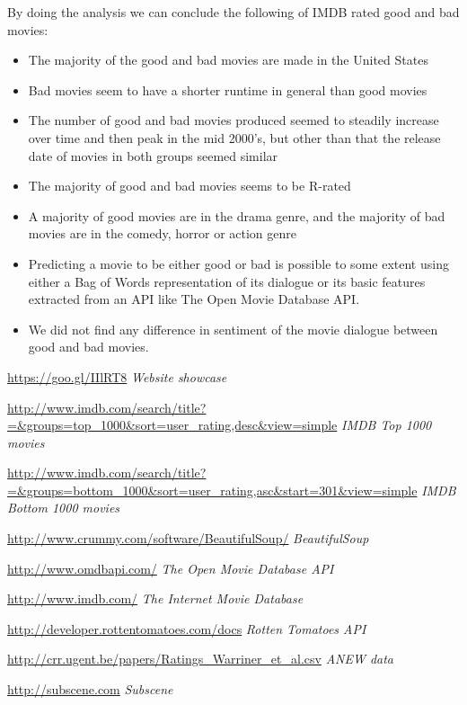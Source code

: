 \documentclass{acm_proc_article-sp}
\begin{document}
By doing the analysis we can conclude the following of IMDB rated good and bad movies:
\begin{itemize}
\item The majority of the good and bad movies are made in the United States
\item Bad movies seem to have a shorter runtime in general than good movies
\item The number of good and bad movies produced seemed to steadily increase over time and then peak in the mid 2000's, but other than that the release date of movies in both groups seemed similar
\item The majority of good and bad movies seems to be R-rated
\item A majority of good movies are in the drama genre, and the majority of bad movies are in the comedy, horror or action genre
\item Predicting a movie to be either good or bad is possible to some extent using either a Bag of Words representation of its dialogue or its basic features extracted from an API like The Open Movie Database API.
\item We did not find any difference in sentiment of the movie dialogue between good and bad movies.
\end{itemize}



\begin{thebibliography}{9}

\url{https://goo.gl/IIlRT8}
\textit{Website showcase}

\url{http://www.imdb.com/search/title?=&groups=top_1000&sort=user_rating,desc&view=simple}
\textit{IMDB Top 1000 movies}

\url{http://www.imdb.com/search/title?=&groups=bottom_1000&sort=user_rating,asc&start=301&view=simple}
\textit{IMDB Bottom 1000 movies}

\url{http://www.crummy.com/software/BeautifulSoup/}
\textit{BeautifulSoup}

\url{http://www.omdbapi.com/}
\textit{The Open Movie Database API}

\url{http://www.imdb.com/}
\textit{The Internet Movie Database}

\url{http://developer.rottentomatoes.com/docs}
\textit{Rotten Tomatoes API}

\url{http://crr.ugent.be/papers/Ratings_Warriner_et_al.csv}
\textit{ANEW data}

\url{http://subscene.com}
\textit{Subscene}

\end{thebibliography}
\end{document}
